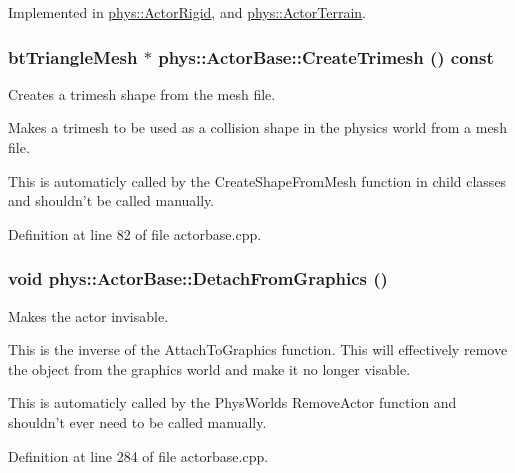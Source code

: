 Implemented in \hyperlink{classphys_1_1ActorRigid_aab4a408ce0724be6adf4c9f51f55f8a1}{phys::ActorRigid}, and \hyperlink{classphys_1_1ActorTerrain_aa5f545a73da45ab219121c4b2cd0ded9}{phys::ActorTerrain}.

\hypertarget{classphys_1_1ActorBase_af869b78fcac01ee153d495953daab382}{
\subsubsection[{CreateTrimesh}]{\setlength{\rightskip}{0pt plus 5cm}btTriangleMesh $\ast$ phys::ActorBase::CreateTrimesh () const}}
\label{d8/d0f/classphys_1_1ActorBase_af869b78fcac01ee153d495953daab382}


Creates a trimesh shape from the mesh file. 

Makes a trimesh to be used as a collision shape in the physics world from a mesh file. \par
 This is automaticly called by the CreateShapeFromMesh function in child classes and shouldn't be called manually. 

Definition at line 82 of file actorbase.cpp.

\hypertarget{classphys_1_1ActorBase_acc352d14b6d7f15694ea108ec1c281ec}{
\subsubsection[{DetachFromGraphics}]{\setlength{\rightskip}{0pt plus 5cm}void phys::ActorBase::DetachFromGraphics ()}}
\label{d8/d0f/classphys_1_1ActorBase_acc352d14b6d7f15694ea108ec1c281ec}


Makes the actor invisable. 

This is the inverse of the AttachToGraphics function. This will effectively remove the object from the graphics world and make it no longer visable. \par
 This is automaticly called by the PhysWorlds RemoveActor function and shouldn't ever need to be called manually. 

Definition at line 284 of file actorbase.cpp.


